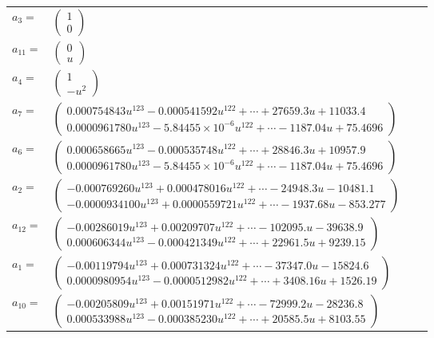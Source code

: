 \documentclass[1p]{elsarticle_modified}
\theoremstyle{definition}
\begin{document}
\begin{tabular}{m{7pt} m{180pt} m{7pt} m{180pt} }
\flushright $a_{3}=$&$\begin{pmatrix}1\\0\end{pmatrix}$ \\
\flushright $a_{11}=$&$\begin{pmatrix}0\\u\end{pmatrix}$ \\
\flushright $a_{4}=$&$\begin{pmatrix}1\\- u^2\end{pmatrix}$ \\
\flushright $a_{7}=$&$\begin{pmatrix}0.000754843 u^{123}-0.000541592 u^{122}+\cdots+27659.3 u+11033.4\\0.0000961780 u^{123}-5.84455\times10^{-6} u^{122}+\cdots-1187.04 u+75.4696\end{pmatrix}$ \\
\flushright $a_{6}=$&$\begin{pmatrix}0.000658665 u^{123}-0.000535748 u^{122}+\cdots+28846.3 u+10957.9\\0.0000961780 u^{123}-5.84455\times10^{-6} u^{122}+\cdots-1187.04 u+75.4696\end{pmatrix}$ \\
\flushright $a_{2}=$&$\begin{pmatrix}-0.000769260 u^{123}+0.000478016 u^{122}+\cdots-24948.3 u-10481.1\\-0.0000934100 u^{123}+0.0000559721 u^{122}+\cdots-1937.68 u-853.277\end{pmatrix}$ \\
\flushright $a_{12}=$&$\begin{pmatrix}-0.00286019 u^{123}+0.00209707 u^{122}+\cdots-102095. u-39638.9\\0.000606344 u^{123}-0.000421349 u^{122}+\cdots+22961.5 u+9239.15\end{pmatrix}$ \\
\flushright $a_{1}=$&$\begin{pmatrix}-0.00119794 u^{123}+0.000731324 u^{122}+\cdots-37347.0 u-15824.6\\0.0000980954 u^{123}-0.0000512982 u^{122}+\cdots+3408.16 u+1526.19\end{pmatrix}$ \\
\flushright $a_{10}=$&$\begin{pmatrix}-0.00205809 u^{123}+0.00151971 u^{122}+\cdots-72999.2 u-28236.8\\0.000533988 u^{123}-0.000385230 u^{122}+\cdots+20585.5 u+8103.55\end{pmatrix}$ \\

\end{tabular}
\end{document}
